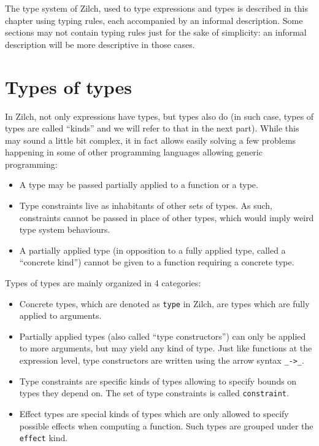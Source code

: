 The type system of Zilch, used to type expressions and types is described in this chapter using typing rules, each accompanied by an informal description.
Some sections may not contain typing rules just for the sake of simplicity: an informal description will be more descriptive in those cases.

\section{Types of types}\label{sec:zilch-staticsem-types}

In Zilch, not only expressions have types, but types also do (in such case, types of types are called “kinds” and we will refer to that in the next part).
While this may sound a little bit complex, it in fact allows easily solving a few problems happening in some of other programming languages allowing generic programming:
\begin{itemize}
	\item A type may be passed partially applied to a function or a type.
	\item Type constraints live as inhabitants of other sets of types.
	      As such, constraints cannot be passed in place of other types, which would imply weird type system behaviours.
	\item A partially applied type (in opposition to a fully applied type, called a ``concrete kind'') cannot be given to a function requiring a concrete type.
\end{itemize}

Types of types are mainly organized in 4 categories:
\begin{itemize}
	\item Concrete types, which are denoted as \verb|type| in Zilch, are types which are fully applied to arguments.
	\item Partially applied types (also called ``type constructors'') can only be applied to more arguments, but may yield any kind of type.
	      Just like functions at the expression level, type constructors are written using the arrow syntax \verb|_->_|.
	\item Type constraints are specific kinds of types allowing to specify bounds on types they depend on.
	      The set of type constraints is called \verb|constraint|.
	\item Effect types are special kinds of types which are only allowed to specify possible effects when computing a function.
	      Such types are grouped under the \verb|effect| kind.
\end{itemize}

